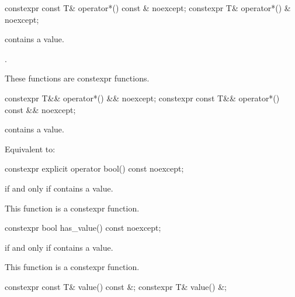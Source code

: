 %
\begin{itemdecl}
constexpr const T& operator*() const & noexcept;
constexpr T& operator*() & noexcept;
\end{itemdecl}

\begin{itemdescr}
\pnum
\expects
{} contains a value.

\pnum
\returns
{}.

\pnum
\remarks
These functions are constexpr functions.
\end{itemdescr}

%
\begin{itemdecl}
constexpr T&& operator*() && noexcept;
constexpr const T&& operator*() const && noexcept;
\end{itemdecl}

\begin{itemdescr}
\pnum
\expects
{} contains a value.

\pnum
\effects
Equivalent to: 
\end{itemdescr}

%
\begin{itemdecl}
constexpr explicit operator bool() const noexcept;
\end{itemdecl}

\begin{itemdescr}
\pnum
\returns
{} if and only if  contains a value.

\pnum
\remarks
This function is a constexpr function.
\end{itemdescr}

%
\begin{itemdecl}
constexpr bool has_value() const noexcept;
\end{itemdecl}

\begin{itemdescr}
\pnum
\returns
{} if and only if  contains a value.

\pnum
\remarks
This function is a constexpr function.
\end{itemdescr}

%
\begin{itemdecl}
constexpr const T& value() const &;
constexpr T& value() &;
\end{itemdecl}

